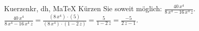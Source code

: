 \begin{MAufgabe}{Kuerzen}{kr, dh, MaTeX}
K\"urzen Sie soweit m\"oglich: $\frac{40\, x^4}{8\, x^4 - 16\, x^4\, z}$.\\ 
\ifLsg\MLoesung
\quad $\frac{40\, x^4}{8\, x^4 - 16\, x^4\, z}=\frac{(8\, x^4)\cdot(5)}{(8\, x^4)\cdot(1 - 2\, z)}=\frac{5}{1 - 2\, z}=\frac{-5}{2\, z - 1}$.\else\relax\fi
 \end{MAufgabe}